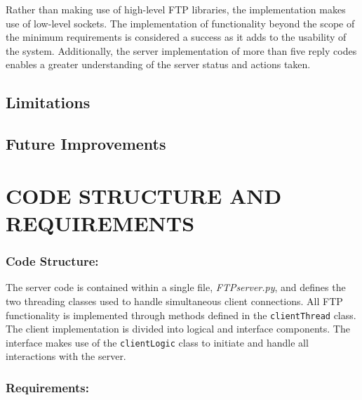 \documentclass[10pt,twocolumn]{witseiepaper}
\begin{document}
Rather than making use of high-level FTP libraries, the implementation makes use of low-level sockets. The implementation of functionality beyond the scope of the minimum requirements is considered a success as it adds to the usability of the system. Additionally, the server implementation of more than five reply codes enables a greater understanding of the server status and actions taken.


\subsection{Limitations}


\subsection{Future Improvements}


\section{CODE STRUCTURE AND REQUIREMENTS}

\subsubsection*{Code Structure: } The server code is contained within a single file, \textit{FTPserver.py}, and defines the two threading classes used to handle simultaneous client connections. All FTP functionality is implemented through methods defined in the \texttt{clientThread} class. The client implementation is divided into logical and interface components. The interface makes use of the \texttt{clientLogic} class to initiate and handle all interactions with the server.  


\subsubsection*{Requirements: }
\end{document}
